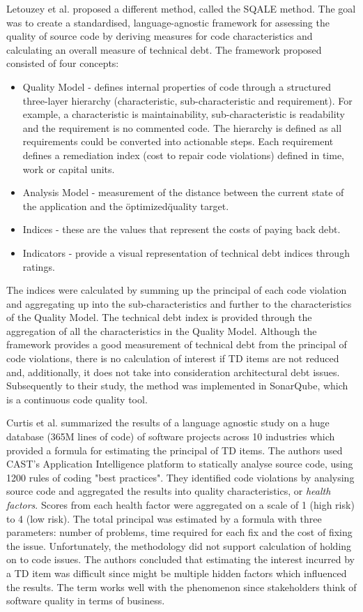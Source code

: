 \documentclass{mprop}
\begin{document}
Letouzey et al. \cite{Letouzey2012} proposed a different method, called the SQALE
method. The goal was to create a standardised, language-agnostic framework for
assessing the quality of source code by deriving measures for code
characteristics and calculating an overall measure of technical debt. The
framework proposed consisted of four concepts:
\begin{itemize}
	\item Quality Model - defines internal properties of code through a
	      structured three-layer hierarchy (characteristic, sub-characteristic and
	      requirement). For example, a characteristic is maintainability,
	      sub-characteristic is readability and the requirement is no commented
	      code. The hierarchy is defined as all requirements could be converted into
	      actionable steps. Each requirement defines a remediation index (cost to
	      repair code violations) defined in time, work or capital units.
	\item Analysis Model - measurement of the distance between the current
	      state of the application and the \"optimized\" quality target.
	\item Indices - these are the values that represent the costs of paying
	      back debt.
	\item Indicators - provide a visual representation of technical debt indices
	      through ratings.
\end{itemize}
The indices were calculated by summing up the principal of each code violation
and aggregating up into the sub-characteristics and further to the
characteristics of the Quality Model. The technical debt index is provided
through the aggregation of all the characteristics in the Quality Model.
Although the framework provides a good measurement of technical debt from the
principal of code violations, there is no calculation of interest if TD items
are not reduced and, additionally, it does not take into consideration
architectural debt issues. Subsequently to their study, the method was
implemented in SonarQube, which is a continuous code quality tool.

Curtis et al. \cite{Curtis2012} summarized the results of a language agnostic
study on a huge database (365M lines of code) of software projects across 10
industries which provided a formula for estimating the principal of TD items.
The authors used CAST's Application Intelligence platform to statically analyse
source code, using 1200 rules of coding "best practices". They identified code
violations by analysing source code and aggregated the results into quality
characteristics, or \textit{health factors}. Scores from each health factor were
aggregated on a scale of 1 (high risk) to 4 (low risk). The total principal was
estimated by a formula with three parameters: number of problems, time required
for each fix and the cost of fixing the issue. Unfortunately, the methodology
did not support calculation of holding on to code issues. The authors concluded
that estimating the interest incurred by a TD item was difficult since might be
multiple hidden factors which influenced the results. The term works well with
the phenomenon since stakeholders think of software quality in terms of
business.
\end{document}
